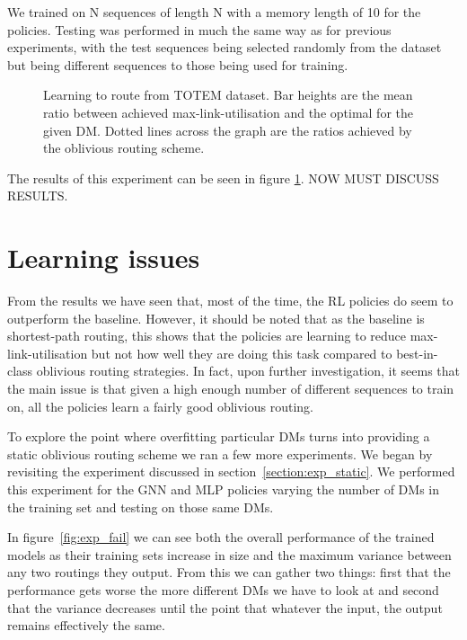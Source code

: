 We trained on N sequences of length N with a memory length of 10 for the policies. Testing was performed in much the same way as for previous experiments, with the test sequences being selected randomly from the dataset but being different sequences to those being used for training.

\begin{figure}
    \centering
%    
    \caption{Learning to route from TOTEM dataset. Bar heights are the mean ratio between achieved max-link-utilisation and the optimal for the given DM. Dotted lines across the graph are the ratios achieved by the oblivious routing scheme.}
    \label{fig:exp_real}
\end{figure}

The results of this experiment can be seen in figure \ref{fig:exp_real}. NOW MUST DISCUSS RESULTS.


\section{Learning issues}
From the results we have seen that, most of the time, the RL policies do seem to outperform the baseline. However, it should be noted that as the baseline is shortest-path routing, this shows that the policies are learning to reduce max-link-utilisation but not how well they are doing this task compared to best-in-class oblivious routing strategies. In fact, upon further investigation, it seems that the main issue is that given a high enough number of different sequences to train on, all the policies learn a fairly good oblivious routing.

To explore the point where overfitting particular DMs turns into providing a static oblivious routing scheme we ran a few more experiments. We began by revisiting the experiment discussed in section~\ref{section:exp_static}. We performed this experiment for the GNN and MLP policies varying the number of DMs in the training set and testing on those same DMs.

In figure~\ref{fig:exp_fail} we can see both the overall performance of the trained models as their training sets increase in size and the maximum variance between any two routings they output. From this we can gather two things: first that the performance gets worse the more different DMs we have to look at and second that the variance decreases until the point that whatever the input, the output remains effectively the same.


